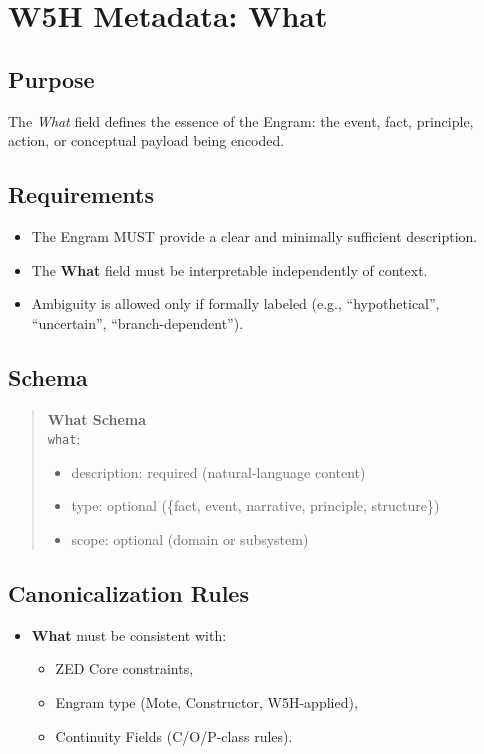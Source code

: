 \chapter{W5H Metadata: What}
\label{chap:W5H_What}

\section{Purpose}

The \emph{What} field defines the essence of the Engram: the event, fact,
principle, action, or conceptual payload being encoded.

\section{Requirements}

\begin{itemize}
    \item The Engram MUST provide a clear and minimally sufficient description.
    \item The \textbf{What} field must be interpretable independently of context.
    \item Ambiguity is allowed only if formally labeled (e.g., ``hypothetical'', 
          ``uncertain'', ``branch-dependent'').
\end{itemize}

\section{Schema}

\begin{quote}
\textbf{What Schema}\\
\texttt{what}: 
\begin{itemize}
    \item description: required (natural-language content)
    \item type: optional (\{fact, event, narrative, principle, structure\})
    \item scope: optional (domain or subsystem)
\end{itemize}
\end{quote}

\section{Canonicalization Rules}

\begin{itemize}
    \item \textbf{What} must be consistent with:
          \begin{itemize}
              \item ZED Core constraints,
              \item Engram type (Mote, Constructor, W5H-applied),
              \item Continuity Fields (C/O/P-class rules).
          \end{itemize}
\end{itemize}
